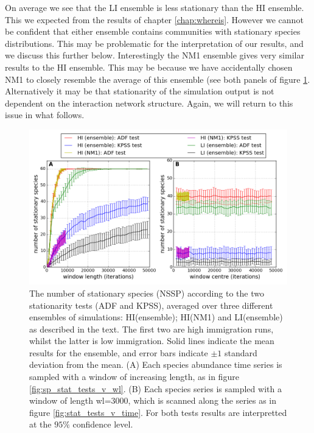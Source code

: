 On average we see that the LI ensemble is less stationary than the HI ensemble. This we expected from the results of chapter \ref{chap:whereis}. However we cannot be confident that either ensemble contains communities with stationary species distributions. This may be problematic for the interpretation of our results, and we discuss this further below. Interestingly the NM1 ensemble gives very similar results to the HI ensemble. This may be because we have accidentally chosen NM1 to closely resemble the average of this ensemble (see both panels of figure \ref{fig:hi_v_li_net7_ensemble}. Alternatively it may be that stationarity of the simulation output is not dependent on the interaction network structure. Again, we will return to this issue in what follows.

\begin{figure}[h]
	\centering
	\includegraphics[width=1.0\linewidth]{"./chapters/chapter04b/figures/hi_v_li_net7_ensemble"}
    \caption{The number of stationary species (NSSP) according to the two stationarity tests (ADF and KPSS), averaged over three different ensembles of simulations: HI(ensemble); HI(NM1) and LI(ensemble)  as described in the text. The first two are high immigration runs, whilst the latter is low immigration. Solid lines indicate the mean results for the ensemble, and error bars indicate $\pm 1$ standard deviation from the mean. (A) Each species abundance time series is sampled with a window of increasing length, as in figure \ref{fig:sp_stat_tests_v_wl}. (B) Each species series is sampled with a window of length wl=$3000$, which is scanned along the series as in figure \ref{fig:stat_tests_v_time}. For both tests results are interpretted at the $95\%$ confidence level.}    
    \label{fig:hi_v_li_net7_ensemble}
\end{figure}

